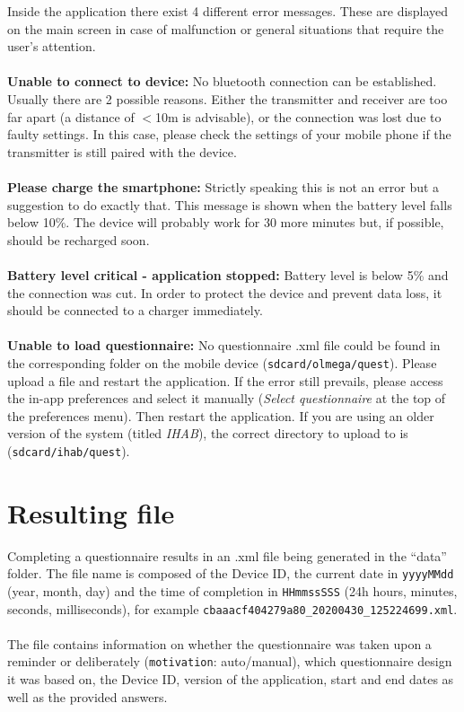 \documentclass[11pt,a4paper,titlepage]{article}
\begin{document}
Inside the application there exist 4 different error messages. These are displayed on the main screen in case of malfunction or general situations that require the user's attention.\\
\\
\textbf{Unable to connect to device:} No bluetooth connection can be established. Usually there are 2 possible reasons. Either the transmitter and receiver are too far apart (a distance of $<$10m is advisable), or the connection was lost due to faulty settings. In this case, please check the settings of your mobile phone if the transmitter is still paired with the device.\\
\\
\textbf{Please charge the smartphone:} Strictly speaking this is not an error but a suggestion to do exactly that. This message is shown when the battery level falls below 10\%. The device will probably work for 30 more minutes but, if possible, should be recharged soon.\\
\\
\textbf{Battery level critical - application stopped:} Battery level is below 5\% and the connection was cut. In order to protect the device and prevent data loss, it should be connected to a charger immediately.\\
\\
\textbf{Unable to load questionnaire:} No questionnaire .xml file could be found in the corresponding folder on the mobile device (\texttt{sdcard/olmega/quest}). Please upload a file and restart the application. If the error still prevails, please access the in-app preferences and select it manually (\emph{Select questionnaire} at the top of the preferences menu). Then restart the application. If you are using an older version of the system (titled \emph{IHAB}), the correct directory to upload to is (\texttt{sdcard/ihab/quest}).

\clearpage

\section{Resulting file}

Completing a questionnaire results in an .xml file being generated in the ``data'' folder. The file name is composed of the Device ID, the current date in \texttt{yyyyMMdd} (year, month, day) and the time of completion in \texttt{HHmmssSSS} (24h hours, minutes, seconds, milliseconds), for example \texttt{cbaaacf404279a80\_20200430\_125224699.xml}.\\
\\
The file contains information on whether the questionnaire was taken upon a reminder or deliberately (\texttt{motivation}: auto/manual), which questionnaire design it was based on, the Device ID, version of the application, start and end dates as well as the provided answers.
\end{document}
